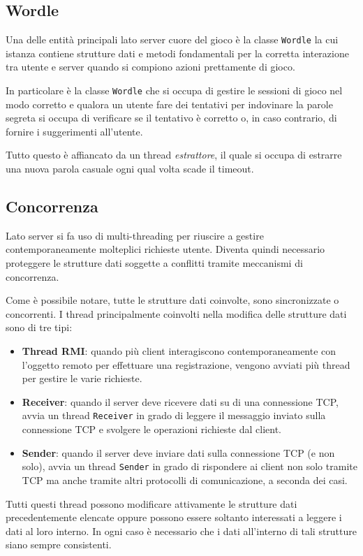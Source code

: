 \subsection{Wordle}
Una delle entità principali lato server cuore del gioco è la classe \verb|Wordle| la cui istanza
contiene strutture dati e metodi fondamentali per la corretta interazione tra utente e server
quando si compiono azioni prettamente di gioco.

In particolare è la classe \verb|Wordle| che si occupa di gestire le sessioni di gioco nel modo
corretto e qualora un utente fare dei tentativi per indovinare la parole segreta si occupa di
verificare se il tentativo è corretto o, in caso contrario, di fornire i suggerimenti all'utente.

Tutto questo è affiancato da un thread \emph{estrattore}, il quale si occupa di estrarre una nuova
parola casuale ogni qual volta scade il timeout.

\subsection{Concorrenza}
Lato server si fa uso di multi-threading per riuscire a gestire contemporaneamente molteplici
richieste utente. Diventa quindi necessario proteggere le strutture dati soggette a conflitti
tramite meccanismi di concorrenza.

Come è possibile notare, tutte le strutture dati coinvolte, sono sincronizzate o concorrenti. I
thread principalmente coinvolti nella modifica delle strutture dati sono di tre tipi:
\begin{itemize}
	\item \textbf{Thread RMI}: quando più client interagiscono contemporaneamente con l'oggetto
	      remoto per effettuare una registrazione, vengono avviati più thread per gestire le varie
	      richieste.
	\item \textbf{Receiver}: quando il server deve ricevere dati su di una connessione TCP,
	      avvia un thread \verb|Receiver| in grado di leggere il messaggio inviato sulla
	      connessione TCP e svolgere le operazioni richieste dal client.
	\item \textbf{Sender}: quando il server deve inviare dati sulla connessione TCP (e non solo),
	      avvia un thread \verb|Sender| in grado di rispondere ai client non solo tramite TCP ma
	      anche tramite altri protocolli di comunicazione, a seconda dei casi.
\end{itemize}
Tutti questi thread possono modificare attivamente le strutture dati precedentemente elencate
oppure possono essere soltanto interessati a leggere i dati al loro interno. In ogni caso è
necessario che i dati all'interno di tali strutture siano sempre consistenti.

